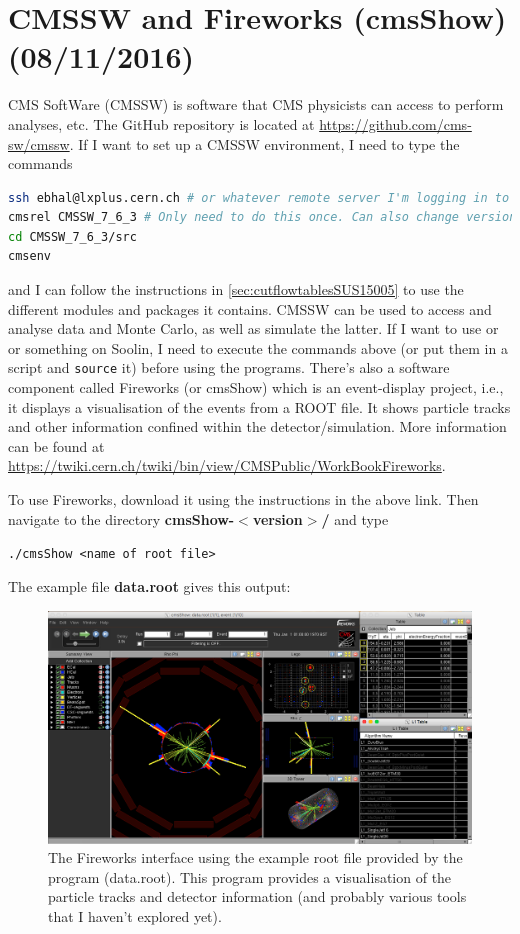 \newpage
\chapter{CMSSW and Fireworks (cmsShow) (08/11/2016)}
\label{sec:fireworks}

CMS SoftWare (CMSSW) is software that CMS physicists can access to perform analyses, etc. The GitHub repository is located at \url{https://github.com/cms-sw/cmssw}. If I want to set up a CMSSW environment, I need to type the commands

\begin{lstlisting}[belowskip=-0.7cm, language=sh, numbers=none]
ssh ebhal@lxplus.cern.ch # or whatever remote server I'm logging in to
cmsrel CMSSW_7_6_3 # Only need to do this once. Can also change version I'm working with
cd CMSSW_7_6_3/src
cmsenv
\end{lstlisting}

and I can follow the instructions in \ref{sec:cutflowtablesSUS15005} to use the different modules and packages it contains. CMSSW can be used to access and analyse data and Monte Carlo, as well as simulate the latter. If I want to use \madgraph or \madanalysis or something on Soolin, I need to execute the commands above (or put them in a script and \verb!source! it) before using the programs. There's also a software component called Fireworks (or cmsShow) which is an event-display project, i.e., it displays a visualisation of the events from a ROOT file. It shows particle tracks and other information confined within the detector/simulation. More information can be found at \url{https://twiki.cern.ch/twiki/bin/view/CMSPublic/WorkBookFireworks}.

To use Fireworks, download it using the instructions in the above link. Then navigate to the directory \textbf{cmsShow-$<$version$>$/} and type

\verb!./cmsShow <name of root file>!

The example file \textbf{data.root} gives this output:

\begin{figure}[H]
\centering
\includegraphics[width=\textwidth]{./sec12/fireworksexample.png}
\caption{The Fireworks interface using the example root file provided by the program (data.root). This program provides a visualisation of the particle tracks and detector information (and probably various tools that I haven't explored yet).}
\end{figure}

